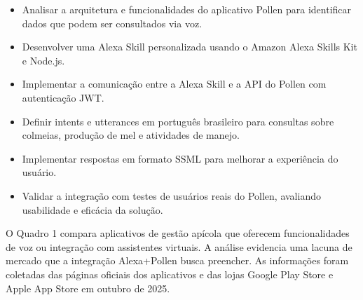 \begin{itemize}
    \item Analisar a arquitetura e funcionalidades do aplicativo Pollen para identificar dados que podem ser consultados via voz.
    
    \item Desenvolver uma Alexa Skill personalizada usando o Amazon Alexa Skills Kit e Node.js.

    \item Implementar a comunicação entre a Alexa Skill e a API do Pollen com autenticação JWT.

    \item Definir intents e utterances em português brasileiro para consultas sobre colmeias, produção de mel e atividades de manejo.

    \item Implementar respostas em formato SSML para melhorar a experiência do usuário.

    \item Validar a integração com testes de usuários reais do Pollen, avaliando usabilidade e eficácia da solução.
\end{itemize}

O Quadro 1 compara aplicativos de gestão apícola que oferecem funcionalidades de voz ou integração com assistentes virtuais. A análise evidencia uma lacuna de mercado que a integração Alexa+Pollen busca preencher. As informações foram coletadas das páginas oficiais dos aplicativos e das lojas Google Play Store e Apple App Store em outubro de 2025.

